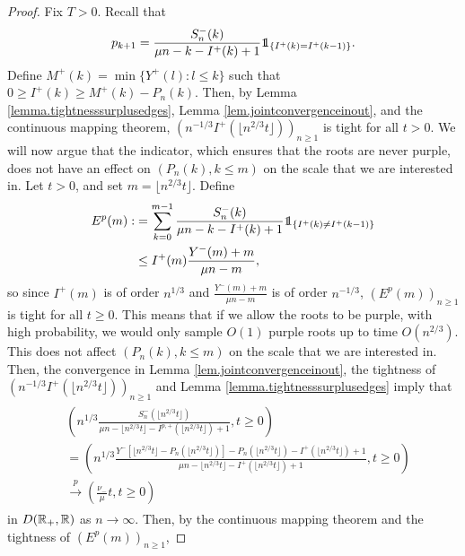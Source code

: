 \begin{proof}
Fix $T>0$. Recall that
$$p_{k+1}=\frac{S_n^{-}(k)}{\mu n - k -I^{+}(k)+1}\one_{\{I^{+}(k)=I^{+}(k-1)\}}.$$
Define $M^+(k)=\min\{Y^+(l):l\leq k\}$ such that $0\geq I^{+}(k)\geq M^+(k)-P_n(k)$.  Then, by Lemma \ref{lemma.tightnesssurplusedges}, Lemma \ref{lem.jointconvergenceinout}, and the continuous mapping theorem, $\left(n^{-1/3}I^+(\lfloor n^{2/3} t \rfloor)\right)_{n\geq 1}$ is tight for all $t>0$.
We will now argue that the indicator, which ensures that the roots are never purple, does not have an effect on $(P_n(k),k\leq m)$ on the scale that we are interested in. Let $t>0$, and set $m=\lfloor n^{2/3}t\rfloor$. Define
\begin{align*}\begin{split}
E^p(m):&=\sum_{k=0}^{m-1}\frac{S_n^{-}(k)}{\mu n - k -I^{+}(k)+1}\one_{\{I^{+}(k)\neq I^{+}(k-1)\}}\\
&\leq I^{+}(m) \frac{Y^-(m)+m}{\mu n - m},\end{split}\end{align*}
so since $I^{+}(m)$ is of order $n^{1/3}$ and $\frac{Y^{-}(m)+m}{\mu n - m}$ is of order $n^{-1/3}$, $(E^p(m))_{n\geq 1}$ is tight for all $t\geq 0$.  This means that if we allow the roots to be purple, with high probability, we would only sample $O(1)$ purple roots up to time $O(n^{2/3})$. This does not affect $(P_n(k),k\leq m)$ on the scale that we are interested in. \\
 Then, the convergence in Lemma \ref{lem.jointconvergenceinout}, the tightness of $\left(n^{-1/3}I^{+}(\lfloor n^{2/3} t \rfloor)\right)_{n\geq 1}$ and Lemma \ref{lemma.tightnesssurplusedges} imply that
\begin{align}\begin{split}\label{eq.convergenceprob}
  &\left(n^{1/3}\frac{S_n^{-}\left(\lfloor n^{2/3} t \rfloor\right)}{\mu n - \lfloor n^{2/3} t \rfloor -I^{p,+}\left(\lfloor n^{2/3} t \rfloor\right)+1},t\geq 0\right)\\
 &=\left(n^{1/3}\frac{Y^-\left[\lfloor n^{2/3} t \rfloor-P_n\left(\lfloor n^{2/3} t \rfloor\right)\right]-P_n\left(\lfloor n^{2/3} t \rfloor\right)-I^{+}\left(\lfloor n^{2/3} t \rfloor\right)+1}{\mu n - \lfloor n^{2/3} t \rfloor -I^{+}\left(\lfloor n^{2/3} t \rfloor\right)+1},t\geq 0\right)\\
 &\overset{p}{\to} \left(\frac{\nu_-}{\mu}t,t\geq 0\right)\end{split}\end{align}
in $D({\mathbb R}_+,{\mathbb R})$ as $n\to \infty$. 
Then, by the continuous mapping theorem and the tightness of $(E^p(m))_{n\geq 1}$,

\end{proof}
